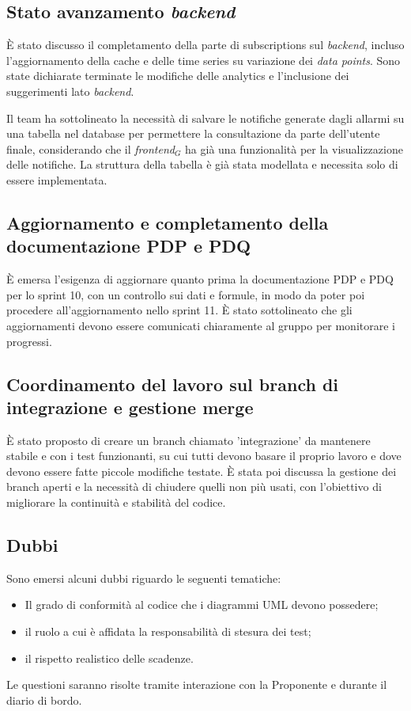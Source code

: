 \documentclass[10pt, letterpaper]{article}
\begin{document}
\subsection*{Stato avanzamento \textit{backend}}
È stato discusso il completamento della parte di subscriptions sul \textit{backend}, incluso l'aggiornamento della cache 
e delle time series su variazione dei \textit{data points}. Sono state dichiarate terminate le modifiche delle analytics e l'inclusione dei suggerimenti lato \textit{backend}.

Il team ha sottolineato la necessità di salvare le notifiche generate dagli allarmi su una tabella nel database per
permettere la consultazione da parte dell'utente finale, considerando che il \textit{frontend$_G$} ha già una funzionalità per la visualizzazione delle notifiche.
La struttura della tabella è già stata modellata e necessita solo di essere implementata.

\subsection*{Aggiornamento e completamento della documentazione PDP e PDQ}
È emersa l'esigenza di aggiornare quanto prima la documentazione PDP e PDQ per lo sprint 10, con un controllo sui dati
e formule, in modo da poter poi procedere all'aggiornamento nello sprint 11. È stato sottolineato che gli aggiornamenti 
devono essere comunicati chiaramente al gruppo per monitorare i progressi.

\subsection*{Coordinamento del lavoro sul branch di integrazione e gestione merge}
È stato proposto di creare un branch chiamato 'integrazione' da mantenere stabile e con i test funzionanti, su cui tutti devono basare il proprio lavoro e dove devono essere fatte piccole modifiche testate.
È stata poi discussa la gestione dei branch aperti e la necessità di chiudere quelli non più usati, con l'obiettivo di migliorare la continuità e stabilità del codice.

\subsection*{Dubbi}
Sono emersi alcuni dubbi riguardo le seguenti tematiche:
\begin{itemize}
    \item Il grado di conformità al codice che i diagrammi UML devono possedere;
    \item il ruolo a cui è affidata la responsabilità di stesura dei test;
    \item il rispetto realistico delle scadenze.
\end{itemize} 
Le questioni saranno risolte tramite interazione con la Proponente e durante il diario di bordo.
\end{document}
